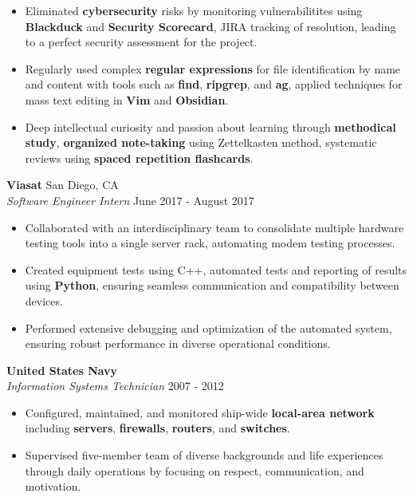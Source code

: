 \documentclass[a4paper]{article}
\begin{document}
\begin{itemize}
	\item Eliminated \textbf{cybersecurity} risks by monitoring vulnerabilitites using \textbf{Blackduck} and \textbf{Security Scorecard}, JIRA tracking of resolution, leading to a perfect security assessment for the project.
	\item Regularly used complex \textbf{regular expressions} for file identification by name and content with tools such as \textbf{find}, \textbf{ripgrep}, and \textbf{ag}, applied techniques for mass text editing in \textbf{Vim} and \textbf{Obsidian}.
	\item Deep intellectual curiosity and passion about learning through \textbf{methodical study}, \textbf{organized note-taking} using Zettelkasten method, systematic reviews using \textbf{spaced repetition flashcards}.
\end{itemize}

\vspace{-1mm}
\textbf{Viasat} \hfill San Diego, CA\\
\textit{Software Engineer Intern} \hfill June 2017 - August 2017\\
\vspace{-1mm}
\begin{itemize} \itemsep 1pt
    \item Collaborated with an interdisciplinary team to consolidate multiple hardware testing tools into a single server rack, automating modem testing processes.
    \item Created equipment tests using C++, automated tests and reporting of results using \textbf{Python}, ensuring seamless communication and compatibility between devices.
    \item Performed extensive debugging and optimization of the automated system, ensuring robust performance in diverse operational conditions.
\end{itemize}

\textbf{United States Navy} \hfill \\
\textit{Information Systems Technician} \hfill 2007 - 2012\\
\vspace{-1mm}
\begin{itemize} \itemsep 1pt
	\item Configured, maintained, and monitored ship-wide \textbf{local-area network} including \textbf{servers}, \textbf{firewalls}, \textbf{routers}, and \textbf{switches}.
	\item Supervised five-member team of diverse backgrounds and life experiences through daily operations by focusing on respect, communication, and motivation.
\end{itemize}
\end{document}
